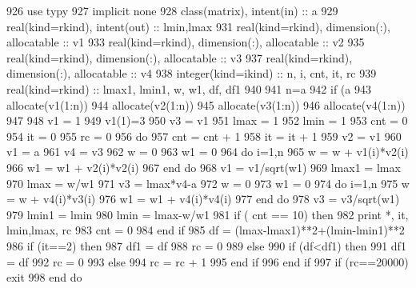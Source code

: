\begin{DoxyCode}
926         \textcolor{keywordtype}{use }typy
927         \textcolor{keywordtype}{implicit none}
928         \textcolor{keywordtype}{class}(matrix), \textcolor{keywordtype}{intent(in)} :: a
929         \textcolor{keywordtype}{real(kind=rkind)}, \textcolor{keywordtype}{intent(out)} :: lmin,lmax
931         \textcolor{keywordtype}{real(kind=rkind)}, \textcolor{keywordtype}{dimension(:)}, \textcolor{keywordtype}{allocatable} :: v1
933         \textcolor{keywordtype}{real(kind=rkind)}, \textcolor{keywordtype}{dimension(:)}, \textcolor{keywordtype}{allocatable} :: v2
935         \textcolor{keywordtype}{real(kind=rkind)}, \textcolor{keywordtype}{dimension(:)}, \textcolor{keywordtype}{allocatable} :: v3
937         \textcolor{keywordtype}{real(kind=rkind)}, \textcolor{keywordtype}{dimension(:)}, \textcolor{keywordtype}{allocatable} :: v4
938         \textcolor{keywordtype}{integer(kind=ikind)} :: n, i, cnt, it, rc
939         \textcolor{keywordtype}{real(kind=rkind)} :: lmax1, lmin1, w, w1, df, df1
940 
941         n=a%
942         \textcolor{keywordflow}{if} (a%
943         \textcolor{keyword}{allocate}(v1(1:n))
944         \textcolor{keyword}{allocate}(v2(1:n))
945         \textcolor{keyword}{allocate}(v3(1:n))
946         \textcolor{keyword}{allocate}(v4(1:n))
947 
948         v1 = 1
949         v1(1)=3
950         v3 = v1
951         lmax = 1
952         lmin = 1
953         cnt = 0
954         it = 0
955         rc = 0
956         do
957             cnt = cnt + 1
958             it = it + 1
959             v2 = v1
960             v1 = a%
961             v4 = v3
962             w = 0
963             w1 = 0
964             \textcolor{keywordflow}{do} i=1,n
965                 w = w + v1(i)*v2(i)
966                 w1 = w1 + v2(i)*v2(i)
967 \textcolor{keyword}{            end }do
968             v1 = v1/sqrt(w1)
969             lmax1 = lmax
970             lmax = w/w1
971             v3 = lmax*v4-a%
972             w = 0
973             w1 = 0
974             \textcolor{keywordflow}{do} i=1,n
975                 w = w + v4(i)*v3(i)
976                 w1 = w1 + v4(i)*v4(i)
977 \textcolor{keyword}{            end }do
978             v3 = v3/sqrt(w1)
979             lmin1 = lmin
980             lmin = lmax-w/w1
981             \textcolor{keywordflow}{if} ( cnt == 10) then
982                 print *, it, lmin,lmax, rc
983                 cnt  = 0
984 \textcolor{keyword}{            end }if
985             df = (lmax-lmax1)**2+(lmin-lmin1)**2
986             \textcolor{keywordflow}{if} (it==2) then
987                 df1 = df
988             rc = 0
989             else
990                 \textcolor{keywordflow}{if} (df<df1) then
991                     df1 = df
992                 rc = 0
993                 else
994                     rc = rc + 1
995 \textcolor{keyword}{                end }if
996 \textcolor{keyword}{            end }if
997             \textcolor{keywordflow}{if} (rc==20000) exit
998 \textcolor{keyword}{        end }do
\end{DoxyCode}


